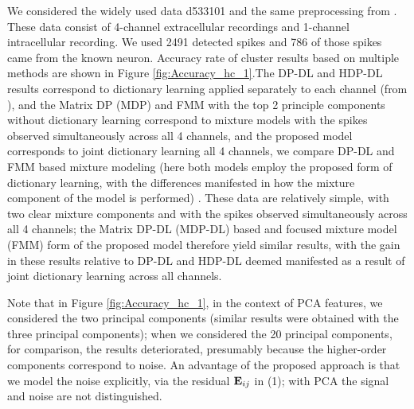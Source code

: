 \documentclass[journal]{IEEEtran}
\begin{document}
We considered
the widely used data d533101 and the same
preprocessing from \cite{Calabrese2010}.
  These data consist of 4-channel extracellular recordings and 1-channel
  intracellular recording.  We used 2491 detected spikes and 786 of those
  spikes came from the known neuron. Accuracy rate of cluster results based on multiple methods are shown in Figure \ref{fig:Accuracy_hc_1}.The DP-DL and HDP-DL results correspond to dictionary learning applied separately to each channel (from \cite{Bo2011}), and the Matrix DP (MDP) and FMM with the top 2 principle components without dictionary learning correspond to mixture models with the spikes observed simultaneously across all 4 channels, and the proposed model corresponds to joint dictionary learning all 4 channels, we compare DP-DL and FMM based mixture modeling (here both models employ the proposed form of dictionary learning, with the differences manifested in how the mixture component of the model is performed) . These data are relatively simple, with two clear mixture components and with the spikes observed simultaneously across all 4 channels; the Matrix DP-DL (MDP-DL) based and focused mixture model (FMM) form of the proposed model therefore yield similar results, with the gain in these results relative to DP-DL and HDP-DL deemed manifested as a result of joint dictionary learning across all channels.

Note that in Figure \ref{fig:Accuracy_hc_1}, in the context of PCA features, we considered the two principal components (similar results were obtained with the three principal components); when we considered the 20 principal components, for comparison, the results deteriorated, presumably because the higher-order components correspond to noise. An advantage of the proposed approach is that we model the noise explicitly, via the residual ${\mathbf E}_{ij}$ in (1); with PCA the signal and noise are not distinguished.
\end{document}
